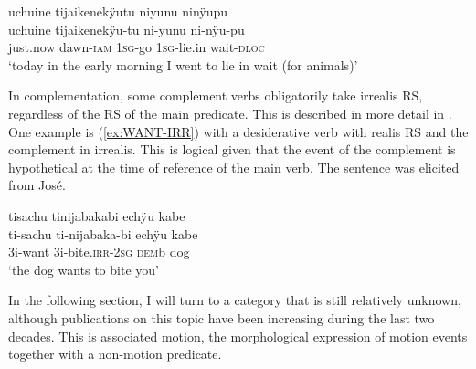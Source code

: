 \ea\label{ex:PURP-pu}
\begingl 
\glpreamble uchuine tijaikenekÿutu niyunu ninÿupu\\
\gla uchuine tijaikenekÿu-tu ni-yunu ni-nÿu-pu\\ 
\glb just.now dawn-\textsc{iam} 1\textsc{sg}-go 1\textsc{sg}-lie.in wait-\textsc{dloc}\\ 
\glft ‘today in the early morning I went to lie in wait (for animals)’\\ 
\endgl
 \trailingcitation{[nxx-a630101g-1.66]}
\xe
{}

In complementation, some complement verbs obligatorily take irrealis RS, regardless of the RS of the main predicate. This is described in more detail in . One example is (\ref{ex:WANT-IRR}) with a desiderative verb with realis RS and the complement in irrealis. This is logical given that the event of the complement is hypothetical at the time of reference of the main verb. The sentence was elicited from José.

\ea\label{ex:WANT-IRR}
\begingl 
\glpreamble tisachu tinijabakabi echÿu kabe\\
\gla ti-sachu ti-nijabaka-bi echÿu kabe\\ 
\glb 3i-want 3i-bite.\textsc{irr}-2\textsc{sg} \textsc{dem}b dog\\ 
\glft ‘the dog wants to bite you’\\ 
\endgl
 \trailingcitation{[oxx-e120414ls-1a.134]}
\xe


In the following section, I will turn to a category that is still relatively unknown, although publications on this topic have been increasing during the last two decades. This is associated motion, the morphological expression of motion events together with a non-motion predicate.

